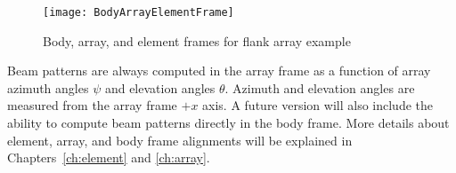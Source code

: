 \begin{figure}[!ht]
\begin{center}
\texttt{[image: BodyArrayElementFrame]}
\caption{\label{fig:ReferenceFrames}Body, array, and element frames for flank array example}
\end{center}
\end{figure}

Beam patterns are always computed in the array frame as a function of array azimuth angles $\psi$ and elevation angles $\theta$. Azimuth and elevation angles are measured from the array frame $+x$ axis. A future version will also include the ability to compute beam patterns directly in the body frame. More details about element, array, and body frame alignments will be explained in Chapters~\ref{ch:element} and \ref{ch:array}.
